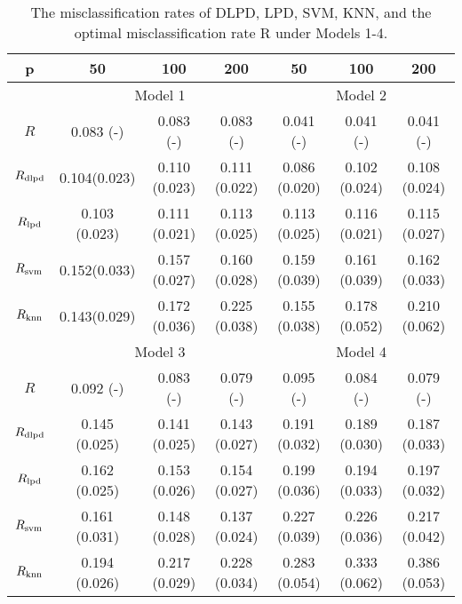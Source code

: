 \documentclass[11pt]{article}
\theoremstyle{definition}
\begin{document}
 
 \begin{table}
 	\centering
 	\begin{tabular}{|cccc|ccc|}
 		\hline
 		p                                   &       50    &   100   &   200 &       50    &   100   &   200  \\
 		\hline
 		& \multicolumn{3}{c|}{Model 1}  & \multicolumn{3}{c|}{Model 2}  \\
 		$R$                       &   0.083 (-)              & 0.083 (-)     &  0.083 (-)  &   0.041 (-)         & 0.041 (-)     &  0.041 (-)   \\
 		$R_{\rm dlpd}$      &  0.104(0.023)      &  0.110 (0.023)   &  0.111 (0.022)    & 0.086 (0.020)  & 0.102 (0.024)   & 0.108 (0.024) \\
 		$R_{\rm lpd}$         &  0.103 (0.023)       & 0.111 (0.021)    &  0.113 (0.025)  & 0.113 (0.025)  &   0.116 (0.021) & 0.115 (0.027) \\
 		$R_{\rm svm}$               & 0.152(0.033)  & 0.157 (0.027)   & 0.160 (0.028)    & 0.159 (0.039)  & 0.161 (0.039)  & 0.162 (0.033)\\
 		$R_{\rm knn}$               & 0.143(0.029)  & 0.172 (0.036)  & 0.225 (0.038)   & 0.155 (0.038)  & 0.178 (0.052)   & 0.210 (0.062)\\
 		\hline
 		& \multicolumn{3}{c|}{Model 3}  & \multicolumn{3}{c|}{Model 4}  \\
 		$R$                       &   0.092 (-)  & 0.083 (-)   &   0.079 (-)    &  0.095 (-)  &  0.084 (-) &   0.079 (-)\\
 		$R_{\rm dlpd}$       &   0.145 (0.025)    &  0.141 (0.025)    &  0.143 (0.027)     & 0.191 (0.032) & 0.189 (0.030)  &  0.187 (0.033) \\
 		$R_{\rm lpd}$           &   0.162 (0.025)     &  0.153 (0.026)   &  0.154 (0.027)  & 0.199 (0.036)  & 0.194 (0.033) & 0.197 (0.032)  \\
 		$R_{\rm svm}$       &   0.161 (0.031) & 0.148 (0.028)  & 0.137 (0.024)   &  0.227 (0.039)   & 0.226 (0.036) & 0.217 (0.042)\\
 		$R_{\rm knn}$        &  0.194 (0.026) & 0.217 (0.029)   & 0.228 (0.034)  &  0.283 (0.054)  & 0.333 (0.062) & 0.386 (0.053)\\
 		\hline
 	\end{tabular}
 	\caption{The misclassification rates of DLPD, LPD, SVM, KNN, and the optimal misclassification rate R under Models 1-4. }\label{sim1}
 \end{table}
 
\end{document}

